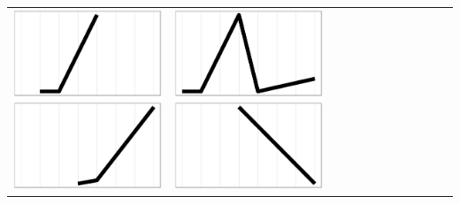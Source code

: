 \documentclass[conference]{IEEEtran}
\begin{document}
\begin{table}
\begin{tabular}{ | b{1.5cm} | c | c | c | c | c | c | c | c | c | c | c |}
 \includegraphics[scale=0.08]{figures/bbcb.ps} &  
 \includegraphics[scale=0.08]{figures/bbbb.ps} &  

\end{tabular}
\end{table}
\end{document}
